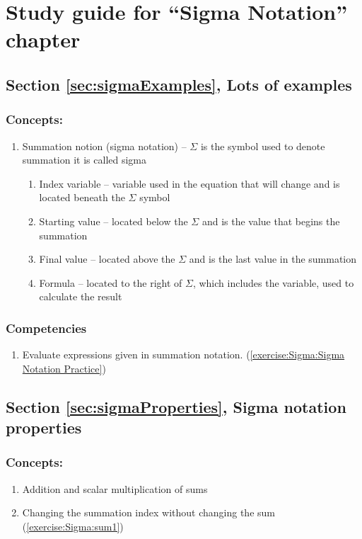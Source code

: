 \section{Study guide  for ``Sigma Notation''  chapter}
\label{sec:Sigma:study} 
\subsection*{Section \ref{sec:sigmaExamples}, Lots of examples}
\subsubsection*{Concepts:}
\begin{enumerate}
\item 
Summation notion (sigma notation) -- $\Sigma$ is the symbol used to denote summation it is called sigma
\begin{enumerate}
\item
Index variable -- variable used in the equation that will change and is located beneath the $\Sigma$ symbol
\item
Starting value -- located below the $\Sigma$ and is the value that begins the summation
\item
Final value -- located above the $\Sigma$ and is the last value in the summation
\item
Formula -- located to the right of $\Sigma$, which includes the variable, used to calculate the result
\end{enumerate}
\end{enumerate}

\subsubsection*{Competencies}
\begin{enumerate}
\item
Evaluate expressions given in summation notation. (\ref{exercise:Sigma:Sigma Notation Practice})
\end{enumerate}


\subsection*{Section \ref{sec:sigmaProperties}, Sigma notation properties}
\subsubsection*{Concepts:}
\begin{enumerate}
\item 
Addition and scalar multiplication of sums
\item
Changing the summation index without changing the sum (\ref{exercise:Sigma:sum1})
\end{enumerate}

